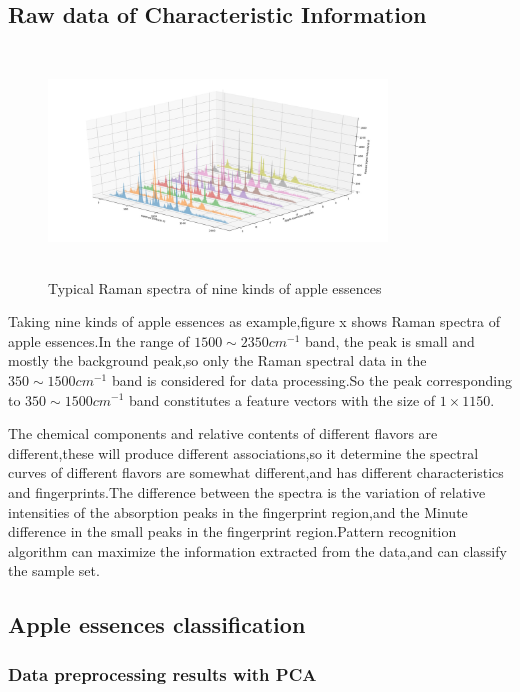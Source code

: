\documentclass[a4paper]{article}
\begin{document}
\subsection{Raw data of Characteristic Information}
\begin{figure}[h]
  \centering
  \includegraphics[width=9cm,height=6cm]{Typical_Raman_spectra}
  \caption{Typical Raman spectra of nine kinds of apple essences}
\end{figure}
Taking nine kinds of apple essences as example,figure x shows Raman spectra of apple essences.In the range of $1500 \sim 2350cm^{-1}$ band, the peak is small and mostly the background peak,so only the Raman spectral data in the $350 \sim 1500cm^{-1}$ band is considered for data processing.So the peak corresponding to $350 \sim 1500cm^{-1}$ band constitutes a feature vectors with the size of $ 1\times 1150 $.

The chemical components and relative contents of different flavors are different,these will produce different associations,so it  determine the spectral curves of different flavors are somewhat different,and has different  characteristics and fingerprints.The difference between the spectra is the variation of relative intensities of the absorption peaks in the fingerprint region,and the Minute difference in the small peaks in the fingerprint region.Pattern recognition algorithm can maximize the information extracted from the data,and can classify the sample set.


\subsection{Apple essences classification}
    \subsubsection{Data preprocessing results with PCA}
\end{document}
